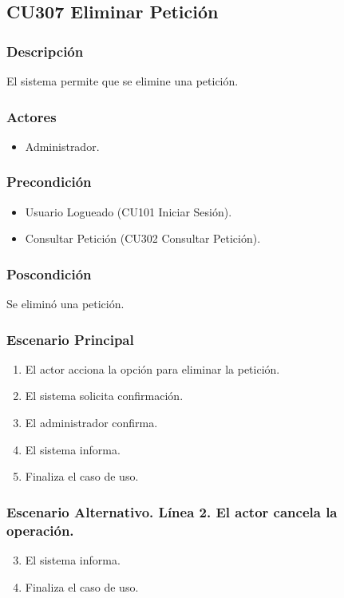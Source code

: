 \subsection{CU307 Eliminar Petici\'{o}n}
\subsubsection{Descripci\'{o}n}
El sistema permite que se elimine una petici\'{o}n.
\subsubsection{Actores}
\begin{itemize}
\item Administrador.
\end{itemize}
\subsubsection{Precondici\'{o}n}
\begin{itemize}
\item Usuario Logueado (CU101 Iniciar Sesi\'{o}n).
\item Consultar Petici\'{o}n (CU302 Consultar Petici\'{o}n).
\end{itemize}
\subsubsection{Poscondici\'{o}n}
Se elimin\'{o} una petici\'{o}n.
\subsubsection{Escenario Principal}
\begin{enumerate}
\item El actor acciona la opci\'{o}n para eliminar la petici\'{o}n.
\item El sistema solicita confirmaci\'{o}n.
\item El administrador confirma.
\item El sistema informa.
\item Finaliza el caso de uso.
\end{enumerate}
\subsubsection{Escenario Alternativo. L\'{i}nea 2. El actor cancela la operaci\'{o}n.}
\begin{enumerate}
\setcounter{enumi}{2}
\item El sistema informa.
\item Finaliza el caso de uso.
\end{enumerate}
